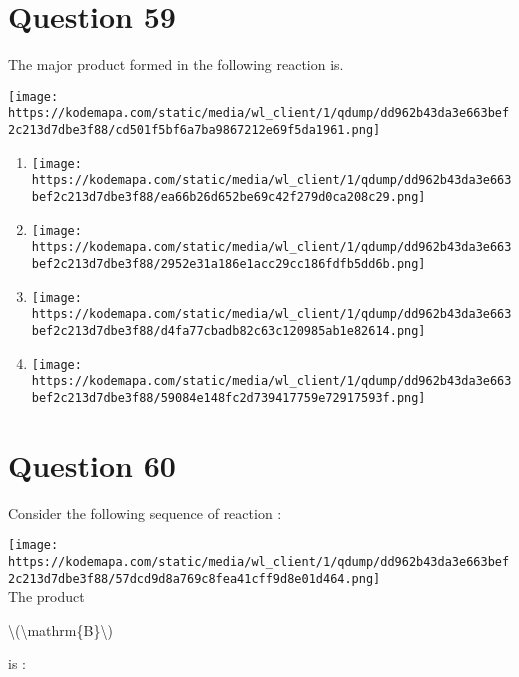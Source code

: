 \documentclass{article}
\begin{document}
\section*{Question 59}
The major product formed in the following reaction is.



\texttt{[image: https://kodemapa.com/static/media/wl\_client/1/qdump/dd962b43da3e663bef2c213d7dbe3f88/cd501f5bf6a7ba9867212e69f5da1961.png]}\\


\begin{enumerate}[label=(\alph*)]
\item \texttt{[image: https://kodemapa.com/static/media/wl\_client/1/qdump/dd962b43da3e663bef2c213d7dbe3f88/ea66b26d652be69c42f279d0ca208c29.png]}


\item \texttt{[image: https://kodemapa.com/static/media/wl\_client/1/qdump/dd962b43da3e663bef2c213d7dbe3f88/2952e31a186e1acc29cc186fdfb5dd6b.png]}


\item \texttt{[image: https://kodemapa.com/static/media/wl\_client/1/qdump/dd962b43da3e663bef2c213d7dbe3f88/d4fa77cbadb82c63c120985ab1e82614.png]}


\item \texttt{[image: https://kodemapa.com/static/media/wl\_client/1/qdump/dd962b43da3e663bef2c213d7dbe3f88/59084e148fc2d739417759e72917593f.png]}


\end{enumerate}
\newpage
\section*{Question 60}
Consider the following sequence of reaction :



\texttt{[image: https://kodemapa.com/static/media/wl\_client/1/qdump/dd962b43da3e663bef2c213d7dbe3f88/57dcd9d8a769c8fea41cff9d8e01d464.png]}\\



The product \textquotesingle{}

\textbackslash(\textbackslash mathrm\{B\}\textbackslash)

\textquotesingle{} is :
\end{document}
